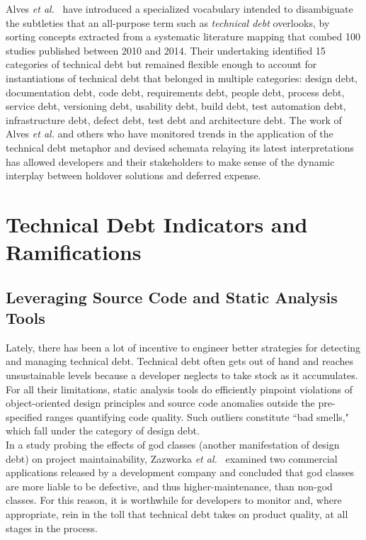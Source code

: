 Alves \textit{et al.}~\cite{alves2014towards} have introduced a specialized vocabulary intended to disambiguate the subtleties that an all-purpose term such as \textit{technical debt} overlooks, by sorting concepts extracted from a systematic literature mapping that combed 100 studies published between 2010 and 2014. Their undertaking identified 15 categories of technical debt but remained flexible enough to account for instantiations of technical debt that belonged in multiple categories: design debt, documentation debt, code debt, requirements debt, people debt, process debt, service debt, versioning debt, usability debt, build debt, test automation debt, infrastructure debt, defect debt, test debt and architecture debt. The work of Alves \textit{et al.} and others who have monitored trends in the application of the technical debt metaphor and devised schemata relaying its latest interpretations has allowed developers and their stakeholders to make sense of the dynamic interplay between holdover solutions and deferred expense.

\section{Technical Debt Indicators and Ramifications}


\subsection{Leveraging Source Code and Static Analysis Tools}

Lately, there has been a lot of incentive to engineer better strategies for detecting and managing technical debt. Technical debt often gets out of hand and reaches unsustainable levels because a developer neglects to take stock as it accumulates. For all their limitations, static analysis tools do efficiently pinpoint violations of object-oriented design principles and source code anomalies outside the pre-specified ranges quantifying code quality. Such outliers constitute ``bad smells," which fall under the category of design debt.\\

In a study probing the effects of god classes (another manifestation of design debt) on project maintainability, Zazworka \textit{et al.}~\cite{zazworka2011investigating} examined two commercial applications released by a development company and concluded that god classes are more liable to be defective, and thus higher-maintenance, than non-god classes. For this reason, it is worthwhile for developers to monitor and, where appropriate, rein in the toll that technical debt takes on product quality, at all stages in the process.\\

